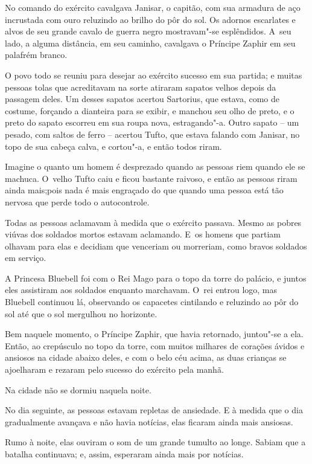 No comando do exército cavalgava Janisar, o capitão, com sua armadura de
aço incrustada com ouro reluzindo ao brilho do pôr do sol. Os adornos
escarlates e alvos de seu grande cavalo de guerra negro mostravam"-se
esplêndidos. A~seu lado, a alguma distância, em seu caminho, cavalgava o
Príncipe Zaphir em seu palafrém branco.

O povo todo se reuniu para desejar ao exército sucesso em sua partida; e
muitas pessoas tolas que acreditavam na sorte atiraram sapatos velhos
depois da passagem deles. Um desses sapatos acertou Sartorius, que
estava, como de costume, forçando a dianteira para se exibir, e manchou
seu olho de preto, e o preto do sapato escorreu em sua roupa nova,
estragando"-a. Outro sapato -- um pesado, com saltos de ferro -- acertou
Tufto, que estava falando com Janisar, no topo de sua cabeça calva, e
cortou"-a, e então todos riram.

Imagine o quanto um homem é desprezado quando as pessoas riem quando ele
se machuca. O~velho Tufto caiu e ficou bastante raivoso, e então as
pessoas riram ainda mais;pois nada é mais engraçado do que quando uma
pessoa está tão nervosa que perde todo o autocontrole.

Todas as pessoas aclamavam à medida que o exército passava. Mesmo as
pobres viúvas dos soldados mortos estavam aclamando. E~os homens que
partiam olhavam para elas e decidiam que venceriam ou morreriam, como
bravos soldados em serviço.

A Princesa Bluebell foi com o Rei Mago para o topo da torre do palácio,
e juntos eles assistiram aos soldados enquanto marchavam. O~rei entrou
logo, mas Bluebell continuou lá, observando os capacetes cintilando e
reluzindo ao pôr do sol até que o sol mergulhou no horizonte.

Bem naquele momento, o Príncipe Zaphir, que havia retornado, juntou"-se a
ela. Então, ao crepúsculo no topo da torre, com muitos milhares de
corações ávidos e ansiosos na cidade abaixo deles, e com o belo céu
acima, as duas crianças se ajoelharam e rezaram pelo sucesso do exército
pela manhã.

Na cidade não se dormiu naquela noite.

No dia seguinte, as pessoas estavam repletas de ansiedade. E à medida
que o dia gradualmente avançava e não havia notícias, elas ficaram ainda
mais ansiosas.

Rumo à noite, elas ouviram o som de um grande tumulto ao longe. Sabiam
que a batalha continuava; e, assim, esperaram ainda mais por notícias.

